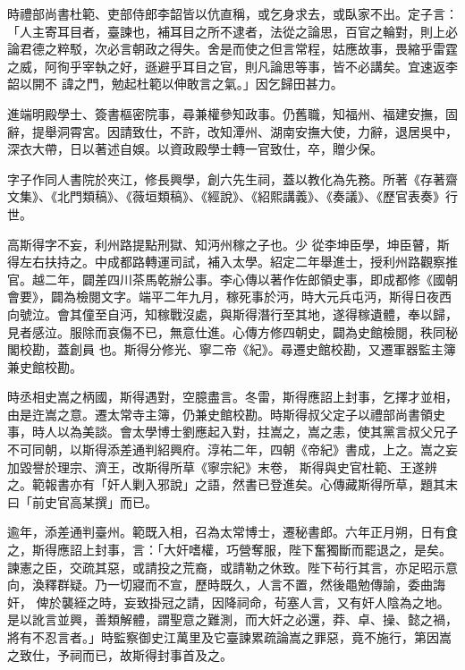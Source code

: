 \begin{pinyinscope}
 時禮部尚書杜範、吏部侍郎李韶皆以伉直稱，或乞身求去，或臥家不出。定子言：「人主寄耳目者，臺諫也，補耳目之所不逮者，法從之論思，百官之輪對，則上必論君德之粹駁，次必言朝政之得失。舍是而使之但言常程，姑應故事，畏縮乎雷霆之威，阿徇乎宰執之好，遜避乎耳目之官，則凡論思等事，皆不必講矣。宜速返李韶以開不
 諱之門，勉起杜範以伸敢言之氣。」因乞歸田甚力。



 進端明殿學士、簽書樞密院事，尋兼權參知政事。仍舊職，知福州、福建安撫，固辭，提舉洞霄宮。因請致仕，不許，改知潭州、湖南安撫大使，力辭，退居吳中，深衣大帶，日以著述自娛。以資政殿學士轉一官致仕，卒，贈少保。



 字子作同人書院於夾江，修長興學，創六先生祠，蓋以教化為先務。所著《存著齋文集》、《北門類稿》、《薇垣類稿》、《經說》、《紹熙講義》、《奏議》、《歷官表奏》行世。



 高斯得字不妄，利州路提點刑獄、知沔州稼之子也。少
 從李坤臣學，坤臣瞽，斯得左右扶持之。中成都路轉運司試，補入太學。紹定二年舉進士，授利州路觀察推官。越二年，闢差四川茶馬乾辦公事。李心傳以著作佐郎領史事，即成都修《國朝會要》，闢為檢閱文字。端平二年九月，稼死事於沔，時大元兵屯沔，斯得日夜西向號泣。會其僮至自沔，知稼戰沒處，與斯得潛行至其地，遂得稼遺體，奉以歸，見者感泣。服除而哀傷不已，無意仕進。心傳方修四朝史，闢為史館檢閱，秩同秘閣校勘，蓋創員
 也。斯得分修光、寧二帝《紀》。尋遷史館校勘，又遷軍器監主簿兼史館校勘。



 時丞相史嵩之柄國，斯得遇對，空臆盡言。冬雷，斯得應詔上封事，乞擇才並相，由是迕嵩之意。遷太常寺主簿，仍兼史館校勘。時斯得叔父定子以禮部尚書領史事，時人以為美談。會太學博士劉應起入對，拄嵩之，嵩之恚，使其黨言叔父兄子不可同朝，以斯得添差通判紹興府。淳祐二年，四朝《帝紀》書成，上之。嵩之妄加毀譽於理宗、濟王，改斯得所草《寧宗紀》末卷，
 斯得與史官杜範、王遂辨之。範報書亦有「奸人剿入邪說」之語，然書已登進矣。心傳藏斯得所草，題其末曰「前史官高某撰」而已。



 逾年，添差通判臺州。範既入相，召為太常博士，遷秘書郎。六年正月朔，日有食之，斯得應詔上封事，言：「大奸嗜權，巧營奪服，陛下奮獨斷而罷退之，是矣。諫憲之臣，交疏其惡，或請投之荒裔，或請勒之休致。陛下茍行其言，亦足昭示意向，渙釋群疑。乃一切寢而不宣，歷時既久，人言不置，然後黽勉傳諭，委曲誨奸，
 俾於襲絰之時，妄致掛冠之請，因降祠命，茍塞人言，又有奸人陰為之地。是以訛言並興，善類解體，謂聖意之難測，而大奸之必還，莽、卓、操、懿之禍，將有不忍言者。」時監察御史江萬里及它臺諫累疏論嵩之罪惡，竟不施行，第因嵩之致仕，予祠而已，故斯得封事首及之。




\end{pinyinscope}
